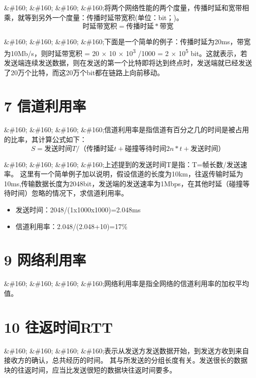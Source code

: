 \&\#160; \&\#160; \&\#160; \&\#160;将两个网络性能的两个度量，传播时延和宽带相乘，就等到另外一个度量：传播时延带宽积(单位：bit；)。
$$时延带宽积=传播时延*带宽$$

\&\#160; \&\#160; \&\#160; \&\#160;下面是一个简单的例子：传播时延为20ms，带宽为10Mb\slash s，则时延带宽积 = 20 × 10 × 10\textsuperscript{3} \slash 1000 = 2 × 10\textsuperscript{5} bit。这就表示，若发送端连续发送数据，则在发送的第一个比特即将达到终点时，发送端就已经发送了20万个比特，而这20万个bit都在链路上向前移动。

\section{7 信道利用率}
\label{7信道利用率}

\&\#160; \&\#160; \&\#160; \&\#160;信道利用率是指信道有百分之几的时间是被占用的比率，其计算公式如下：
$$S=发送时间T /（传播时延t+碰撞等待时间2n*t+发送时间）$$

\&\#160; \&\#160; \&\#160; \&\#160;上述提到的发送时间T是指：T=帧长数\slash 发送速率。
这里有一个简单例子加以说明，假设信道的长度为10km，往返传输时延为10ms,传输数据长度为2048bit，发送端的发送速率为1Mbps，在其他时延（碰撞等待时间）忽略的情况下，求信道利用率。

\begin{itemize}
\item 发送时间：2048\slash (1x1000x1000)=2.048ms

\item 信道利用率：2.048\slash (2.048+10)=17\%

\end{itemize}

\section{9 网络利用率}
\label{9网络利用率}

\&\#160; \&\#160; \&\#160; \&\#160;网络利用率是指全网络的信道利用率的加权平均值。

\section{10 往返时间RTT}
\label{10往返时间rtt}

\&\#160; \&\#160; \&\#160; \&\#160;表示从发送方发送数据开始，到发送方收到来自接收方的确认，总共经历的时间。
其与所发送的分组长度有关。发送很长的数据块的往返时间，应当比发送很短的数据块往返时间要多。
